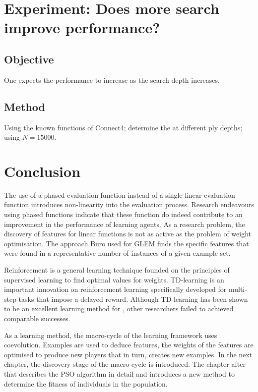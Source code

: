 \section{Experiment: Does more search improve performance?}
\subsection*{Objective}
One expects the performance to increase as the search depth increases.
\subsection*{Method}
Using the known functions of Connect4; determine the  at different ply depths; using $N = 15000$.
\section{Conclusion}
\label{sec:learning-conclusion}
The use of a phased evaluation function instead of a single linear evaluation function introduces non-linearity into the evaluation process. Research endeavours using phased functions indicate that these function do indeed contribute to an improvement in the  performance of learning agents.  As a research problem, the discovery of features for linear functions is not as active as the problem of weight optimisation.  The approach Buro used for GLEM finds the specific features that were found in a representative number of instances of a given example set.

Reinforcement is a general learning technique founded on the principles of supervised learning to find optimal values for weights.  TD-learning is an important innovation on reinforcement learning specifically developed for multi-step tasks that impose a delayed reward.  Although TD-learning has been shown to be an excellent learning method for , other researchers failed to achieved comparable successes. %

As a learning method, the macro-cycle of the learning framework uses coevolution.  Examples are used to deduce features, the weights of the features are optimised to produce new players that in turn, creates new examples.  In the next chapter, the discovery stage of the macro-cycle is introduced.  The chapter after that describes the PSO algorithm in detail and introduces a new method to determine the fitness of individuals in the population.   
